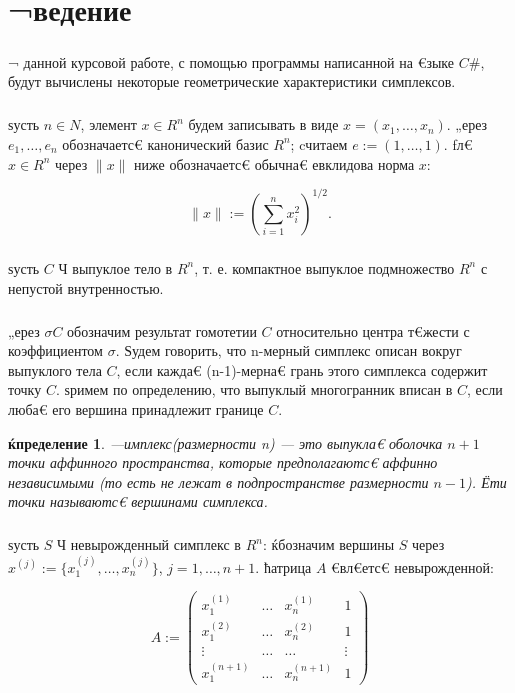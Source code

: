 \documentclass[12pt]{article} %
\begin{document}
\tableofcontents
\newpage
\section{¬ведение}

\subparagraph{}¬ данной курсовой работе, с помощью программы написанной на €зыке $C\#$, будут вычислены некоторые геометрические характеристики симплексов. 
\subparagraph{}ѕусть $n \in N$, элемент $x \in R^{n}$ будем записывать в виде $x = (x_1, \dots, x_n)$. „ерез $e_1, \dots , e_n$ обозначаетс€ канонический базис $R^{n}$; cчитаем $e := (1,\dots, 1)$. ƒл€ $x \in R^{n}$ через $\|x\|$ ниже обозначаетс€ обычна€ евклидова норма $x$:
	
	\begin{equation*}
	\|x\|:= ({\sum_{i=1}^n x_i^{2}})^{1/2}.
	\end{equation*}

	\subparagraph{}ѕусть $C$ Ч выпуклое тело в $R^n$, т. е. компактное выпуклое подмножество $R^n$ с непустой внутренностью. 
	\subparagraph{}„ерез $\sigma C$ обозначим результат гомотетии $C$ относительно центра т€жести с коэффициентом $\sigma$. Ѕудем говорить, что n-мерный симплекс описан вокруг выпуклого тела $C$, если кажда€ (n-1)-мерна€ грань этого симплекса содержит точку $C$. ѕримем по определению, что выпуклый многогранник вписан в $C$, если люба€ его вершина принадлежит границе $C$.
	
	\newtheorem{Def}{ќпределение}
	\begin{Def} —имплекс(размерности n) --- это выпукла€ оболочка $n+1$ точки аффинного пространства, которые предполагаютс€ аффинно независимыми (то есть не лежат в подпространстве размерности $n-1$). Ёти точки называютс€ вершинами симплекса.
	\end{Def}
	
	\subparagraph{} ѕусть $S$ Ч невырожденный симплекс в $R^n$: ќбозначим вершины $S$ через $x^{(j)}:=\{x_1^{(j)},\dots,x_n^{(j)}\}$, $j=1,\dots,n+1$. ћатрица $A$ €вл€етс€ невырожденной:
	
	\begin{equation}\label{f1}
		A :=
		\begin{pmatrix}
			x_1^{(1)} & \dots & x_n^{(1)} & 1 \\
			x_1^{(2)} & \dots & x_n^{(2)} & 1 \\
			\vdots  & \dots  & \dots  & \vdots \\
			x_1^{(n+1)} & \dots & x_n^{(n+1)} & 1
		\end{pmatrix}
	\end{equation}
	
\end{document}

